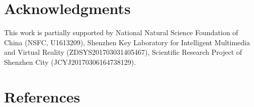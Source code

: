 \documentclass[5p]{elsarticle}
\begin{document}
\section*{Acknowledgments}
This work is partially supported by National Natural Science Foundation of China (NSFC, U1613209),  Shenzhen Key Laboratory for Intelligent Multimedia and Virtual Reality (ZDSYS201703031405467), Scientific Research Project of Shenzhen City (JCYJ20170306164738129).

\section*{References}


\end{document}
